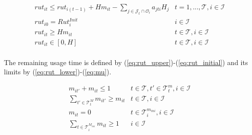 \documentclass[a4paper,onecolumn,fleqn]{article}
\begin{document}
    \begin{align}
         & rut_{it} \leq rut_{i(t-1)} + H m_{it} - \sum_{j \in \mathcal{J}_t \cap \mathcal{O}_i} a_{jti} H_j & t =1, ..., \mathcal{T}, i \in \mathcal{I} \label{eq:rut_upper}\\
        & rut_{i0} = Rut^{Init}_i
               & i \in \mathcal{I} \label{eq:rut_initial}\\
        & rut_{it} \geq H m_{it}
                & t \in \mathcal{T}, i \in \mathcal{I}\label{eq:rut_lower}\\ 
        & rut_{it} \in [0,H]
                & t \in \mathcal{T}, i \in \mathcal{I} \label{eq:mu} \\               
    \end{align}

    The remaining usage time is defined by (\ref{eq:rut_upper})-(\ref{eq:rut_initial}) and its limits by (\ref{eq:rut_lower})-(\ref{eq:mu}). 

    \begin{align}
        & m_{it'} + m_{it} \leq 1
          & t \in \mathcal{T}, t' \in \mathcal{T}^{m}_t, i \in \mathcal{I}\label{eq:ret_min}\\ 
        & \sum_{t' \in \mathcal{T}^{M}_t} m_{it'} \geq  m_{it}
          & t \in \mathcal{T}, i \in \mathcal{I}\label{eq:ret_max}\\
        & m_{it} = 0
          & t \in \mathcal{T}^{m_{ini}}_i, i \in \mathcal{I}\label{eq:ret_min_init} \\
        & \sum_{t \in \mathcal{T}^{M_{ini}}_i} m_{it} \geq  1 
          & i \in \mathcal{I}\label{eq:ret_max_init}
    \end{align}
\end{document}
